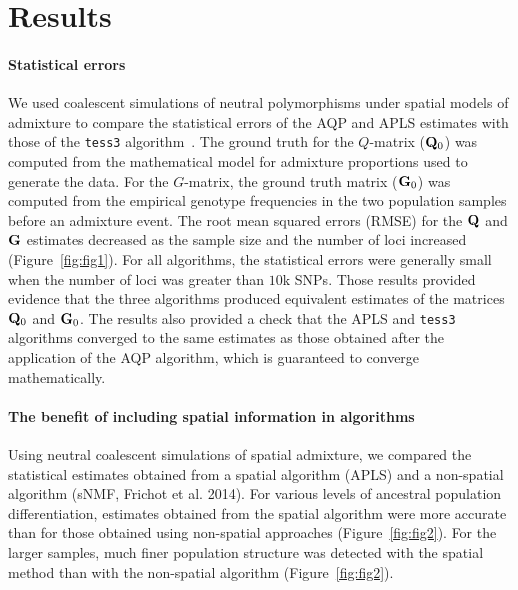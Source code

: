 \clearpage
\newpage


\section{Results}
\paragraph{Statistical errors} We used coalescent simulations of neutral
polymorphisms under spatial models of admixture to compare the statistical
errors of the AQP and APLS estimates with those of the {\tt tess3}
algorithm~\citep{Caye2016}. The ground truth for the $Q$-matrix (${\bf Q}_0$)
was computed from the mathematical model for admixture proportions used to
generate the data. For the $G$-matrix, the ground truth matrix (${\bf G}_0$) was
computed from the empirical genotype frequencies in the two population samples
before an admixture event. The root mean squared errors (RMSE) for the ${\bf Q}$
and ${\bf G}$ estimates decreased as the sample size and the number of loci
increased (Figure~\ref{fig:fig1}). For all algorithms, the statistical errors were generally
small when the number of loci was greater than $10$k SNPs. Those results
provided evidence that the three algorithms produced equivalent estimates of the
matrices ${\bf Q}_0$ and ${\bf G}_0$. The results also provided a check
that the APLS and {\tt tess3} algorithms converged to the same estimates as
those obtained after the application of the AQP algorithm, which is guaranteed
to converge mathematically.


\paragraph{The benefit of including spatial information in algorithms} Using
neutral coalescent simulations of spatial admixture, we compared the statistical
estimates obtained from a spatial algorithm (APLS) and a non-spatial algorithm
(sNMF, Frichot et al. 2014). For various levels of ancestral population
differentiation, estimates obtained from the spatial algorithm were more
accurate than for those obtained using non-spatial approaches (Figure~\ref{fig:fig2}). For
the larger samples, much finer population structure was detected with the
spatial method than with the non-spatial algorithm (Figure~\ref{fig:fig2}).

